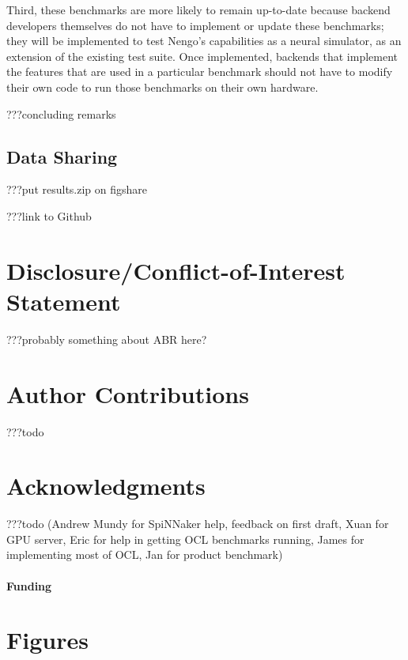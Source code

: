 \documentclass{frontiersSCNS}
\begin{document}
Third, these benchmarks are more likely to
remain up-to-date because backend developers
themselves do not have to implement or update
these benchmarks;
they will be implemented to test Nengo's
capabilities as a neural simulator,
as an extension of the existing test suite.
Once implemented, backends that implement
the features that are used in a particular benchmark
should not have to modify their own code
to run those benchmarks on their own hardware.

???concluding remarks

\subsection{Data Sharing}

???put results.zip on figshare

???link to Github

\section*{Disclosure/Conflict-of-Interest Statement}

???probably something about ABR here?

\section*{Author Contributions}

???todo

\section*{Acknowledgments}

???todo
(Andrew Mundy for SpiNNaker help, feedback on first draft,
Xuan for GPU server, Eric for help in getting OCL benchmarks running,
James for implementing most of OCL, Jan for product benchmark)

\paragraph{Funding\textcolon} %




\section*{Figures}
\end{document}

